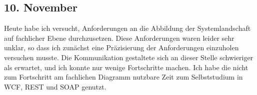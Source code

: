 \subsection{10. November}
Heute habe ich versucht, Anforderungen an die Abbildung der Systemlandschaft auf fachlicher Ebene durchzusetzen. Diese Anforderungen waren leider sehr unklar, so dass ich zunächst eine Präzisierung der Anforderungen einzuholen versuchen musste. Die Kommunikation gestaltete sich an dieser Stelle schwieriger als erwartet, und ich konnte nur wenige Fortschritte machen. Ich habe die nicht zum Fortschritt am fachlichen Diagramm nutzbare Zeit zum Selbststudium in WCF, REST und SOAP genutzt.